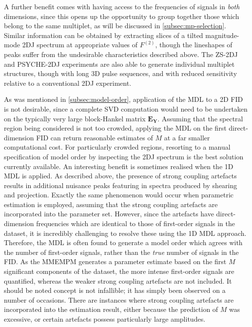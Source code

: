 A further benefit comes with having access to the frequencies of
signals in \emph{both} dimensions, since this opens up the opportunity to group
together those which belong to the same multiplet, as will be discussed in
\cref{subsec:mp-selection}.
Similar information can be obtained
by extracting slices of a tilted magnitude-mode \ac{2DJ} spectrum at
appropriate values of $F^{(2)}$, though the lineshapes of peaks suffer from the
undesirable characteristics described above. The
\ac{ZS}-\ac{2DJ}\cite{Pell2007} and
\ac{PSYCHE}-\ac{2DJ}\cite{Foroozandeh2015,Kiraly2017} experiments are also able
to generate individual multiplet structures, though with long \ac{3D} pulse
sequences, and with reduced sensitivity relative to a conventional \ac{2DJ}
experiment.

As was mentioned in \cref{subsec:model-order}, application of the
\ac{MDL} to a \ac{2D} \ac{FID} is not desirable, since a complete \ac{SVD}
computation would need to be undertaken on the typically very large
block-Hankel matrix $\symbf{E}_{\symbf{Y}}$.
Assuming that the spectral region being considered is not too
crowded, applying the \ac{MDL} on the first direct-dimension \ac{FID} can
return reasonable estimates of $M$ at a far smaller computational cost. For
particularly crowded regions, resorting to a manual specification of model
order by inspecting the \ac{2DJ} spectrum is the best solution currently
available.
An interesting benefit is sometimes realised when the \ac{1D} \ac{MDL} is
applied.
As described above, the presence of strong coupling artefacts results in
additional nuisance peaks featuring in spectra produced by shearing and
projection. Exactly the
same phenomenon would occur when parametric estimation is employed, assuming
that the strong coupling artefacts are incorporated into the parameter
set. However, since the
artefacts have direct-dimension frequencies which are identical to those of
first-order signals in the dataset, it is incredibly challenging to resolve
these using the \ac{1D} \ac{MDL} approach. Therefore, the \ac{MDL} is often
found to generate a model order which agrees with the number of first-order
signals, rather than the \emph{true} number of signals in the \ac{FID}. As the
\ac{MMEMPM} generates a parameter estimate based on the first $M$ significant
components of the dataset, the more intense first-order signals are quantified,
whereas the weaker strong coupling artefacts are not included. It should be
noted concept is not infallible; it has simply been observed on a number of
occasions. There are instances where strong coupling artefacts are incorporated
into the estimation result, either because the prediction of $M$ was excessive,
or certain artefacts possess particularly large amplitudes.

